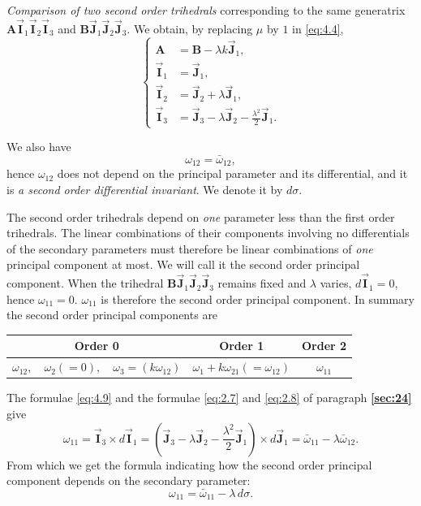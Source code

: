 \documentclass[leqno,11pt]{book}
\numberwithin{equation}{chapter}
\theoremstyle{shape1}
\theoremstyle{shapesmall}
\newcommand{\fsref}[1]{{\rm\textsection\textbf{\ref{sec:#1}}}}
\newcommand{\rvec}[1]{\vec{\mathbf{#1}}}
\newcommand{\ivec}{\rvec{I}}
\newcommand{\jvec}{\rvec{J}}
\begin{document}
\emph{Comparison of two second order trihedrals} corresponding to the same generatrix $\mathbf{A}\ivec_{1}\ivec_{2}\ivec_{3}$ and $\mathbf{B}\jvec_{1}\jvec_{2}\jvec_{3}$. We obtain, by replacing $\mu$ by $1$ in \eqref{eq:4.4},
\begin{equation}
  \label{eq:4.9}
  \left\{
    \begin{aligned}
      \mathbf{A}&=\mathbf{B}-\lambda k\jvec_{1},\\
      \ivec_{1}&=\jvec_{1},\\
      \ivec_{2}&=\jvec_{2}+\lambda\jvec_{1},\\
      \ivec_{3}&=\jvec_{3}-\lambda\jvec_{2}-\frac{\lambda^{2}}{2}\jvec_{1}.
    \end{aligned}
  \right.
\end{equation}

We also have
\[
\omega_{12}=\bar\omega_{12},
\]
hence $\omega_{12}$ does not depend on the principal parameter and its differential, and it is \emph{a second order differential invariant}. We denote it by $d\sigma$.

The second order trihedrals depend on \emph{one} parameter less than the first order trihedrals. The linear combinations of their components involving no differentials of the secondary parameters must therefore be linear combinations of \emph{one} principal component at most. We will call it the second order principal component. When the trihedral $\mathbf{B}\jvec_{1}\jvec_{2}\jvec_{3}$ remains fixed and $\lambda$ varies, $d\ivec_{1}=0$, hence $\omega_{11}=0$. $\omega_{11}$ is therefore the second order principal component. In summary the second order principal components are
\begin{center}
  \begin{tabular}{|c|c|c|}
    \hline
    Order 0&Order 1&Order 2\\
    \hline
    $\omega_{12},\quad\omega_{2}(=0),\quad\omega_{3}=(k\omega_{12})$&$\omega_{1}+k\omega_{21}(=\omega_{12})$&$\omega_{11}$\\
    \hline
  \end{tabular}
\end{center}

The formulae \eqref{eq:4.9} and the formulae \eqref{eq:2.7} and \eqref{eq:2.8} of paragraph \fsref{24} give
\[
\omega_{11}=\ivec_{3}\times d\ivec_{1}=\left(\jvec_{3}-\lambda\jvec_{2}-\frac{\lambda^{2}}{2}\jvec_{1}\right)\times d\jvec_{1}=\bar\omega_{11}-\lambda\bar\omega_{12}.
\]
From which we get the formula indicating how the second order principal component depends on the secondary parameter:
\begin{equation}
  \label{eq:4.10}
  \omega_{11}=\bar\omega_{11}-\lambda\,d\sigma.
\end{equation}
\end{document}
